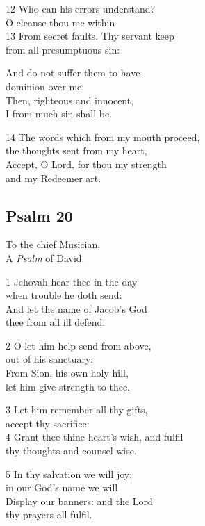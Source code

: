 \begin{multicols}{3}
12 Who can his errors understand?\\
O cleanse thou me within\\
13 From secret faults. Thy servant keep\\
from all presumptuous sin:

And do not suffer them to have\\
dominion over me:\\
Then, righteous and innocent,\\
I from much sin shall be.

14 The words which from my mouth proceed,\\
the thoughts sent from my heart,\\
Accept, O Lord, for thou my strength\\
and my Redeemer art.

\begin{center}
\quad{}\quad{}
\end{center}

\subsection*{Psalm 20 }

To the chief Musician,\\
A \emph{Psalm} of David.

1 Jehovah hear thee in the day\\
when trouble he doth send:\\
And let the name of Jacob’s God\\
thee from all ill defend.

2 O let him help send from above,\\
out of his sanctuary:\\
From Sion, his own holy hill,\\
let him give strength to thee.

3 Let him remember all thy gifts,\\
accept thy sacrifice:\\
4 Grant thee thine heart’s wish, and fulfil\\
thy thoughts and counsel wise.

5 In thy salvation we will joy;\\
in our God’s name we will\\
Display our banners: and the Lord\\
thy prayers all fulfil.


\end{multicols}
